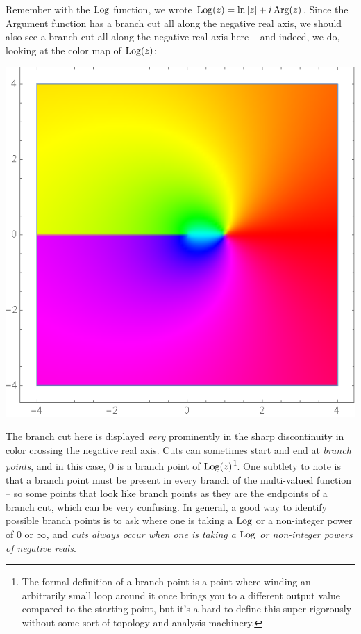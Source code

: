 Remember with the $\operatorname*{Log}$ function, we wrote $\operatorname*{Log}(z) = \ln|z| + i\operatorname*{Arg}(z)$. Since the Argument function has a branch cut all along the negative real axis, we should also see a branch cut all along the negative real axis here -- and indeed, we do, looking at the color map of $\operatorname*{Log}(z)$:
\begin{center}
    \includegraphics[scale=0.27]{images/colorlogz.png}
\end{center}
The branch cut here is displayed \textit{very} prominently in the sharp discontinuity in color crossing the negative real axis. Cuts can sometimes start and end at \textit{branch points}, and in this case, 0 is a branch point of $\operatorname*{Log}(z)$\footnote{The formal definition of a branch point is a point where winding an arbitrarily small loop around it once brings you to a different output value compared to the starting point, but it's a hard to define this super rigorously without some sort of topology and analysis machinery.}. One subtlety to note is that a branch point must be present in every branch of the multi-valued function -- so some points that look like branch points as they are the endpoints of a branch cut, which can be very confusing. In general, a good way to identify possible branch points is to ask where one is taking a $\operatorname*{Log}$ or a non-integer power of 0 or $\infty$, and \textit{cuts always occur when one is taking a $\operatorname*{Log}$ or non-integer powers of negative reals}.

